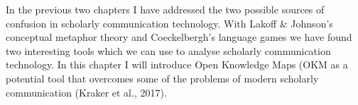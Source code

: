 In the previous two chapters I have addressed the two possible sources of confusion in scholarly communication technology. With Lakoff & Johnson’s conceptual metaphor theory and Coeckelbergh’s language games we have found two interesting tools which we can use to analyse scholarly communication technology. In this chapter I will introduce Open Knowledge Maps (OKM as a potential tool that overcomes some of the problems of modern scholarly communication (Kraker et al., 2017).